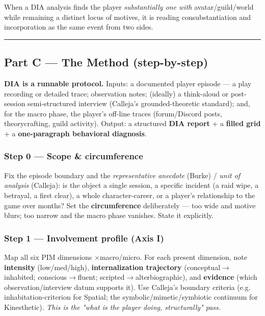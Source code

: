 \documentclass[11pt]{report}
\begin{document}
When a DIA analysis finds the player \textit{substantially one with} avatar/guild/world while remaining a distinct locus of motives, it is reading consubstantiation and incorporation as the same event from two sides.


\vspace{0.4em}\hrule\vspace{0.8em}


\subsection{Part C — The Method (step-by-step)}


\textbf{DIA is a runnable protocol.} Inputs: a documented player episode — a play recording or detailed trace; observation notes; (ideally) a think-aloud or post-session semi-structured interview (Calleja's grounded-theoretic standard); and, for the macro phase, the player's off-line traces (forum/Discord posts, theorycrafting, guild activity). Output: a structured \textbf{DIA report} + a \textbf{filled grid} + a \textbf{one-paragraph behavioral diagnosis}.


\subsubsection{Step 0 — Scope \& circumference}

Fix the episode boundary and the \textit{representative anecdote} (Burke) / \textit{unit of analysis} (Calleja): is the object a single session, a specific incident (a raid wipe, a betrayal, a first clear), a whole character-career, or a player's relationship to the game over months? Set the \textbf{circumference} deliberately — too wide and motive blurs; too narrow and the macro phase vanishes. State it explicitly.


\subsubsection{Step 1 — Involvement profile (Axis I)}

Map all six PIM dimensions $\times$\allowbreak  macro/micro. For each present dimension, note \textbf{intensity} (low/med/high), \textbf{internalization trajectory} (conceptual$\rightarrow$\allowbreak inhabited; conscious$\rightarrow$\allowbreak fluent; scripted$\rightarrow$\allowbreak alterbiographic), and \textbf{evidence} (which observation/interview datum supports it). Use Calleja's boundary criteria (e.g. inhabitation-criterion for Spatial; the symbolic/mimetic/symbiotic continuum for Kinesthetic). \textit{This is the "what is the player doing, structurally" pass.}
\end{document}
